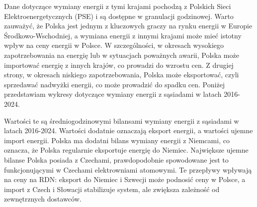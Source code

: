 Dane dotyczące wymiany energii z tymi krajami pochodzą z Polskich Sieci Elektroenergetycznych (PSE) i są dostępne w granulacji godzinowej. Warto zauważyć, że Polska jest jednym z kluczowych graczy na rynku energii w Europie Środkowo-Wschodniej, a wymiana energii z innymi krajami może mieć istotny wpływ na ceny energii w Polsce. W szczególności, w okresach wysokiego zapotrzebowania na energię lub w sytuacjach poważnych awarii, Polska może importować energię z innych krajów, co prowadzi do wzrostu cen. Z drugiej strony, w okresach niskiego zapotrzebowania, Polska może eksportować, czyli sprzedawać nadwyżki energii, co może prowadzić do spadku cen. Poniżej przedstawiam wykresy dotyczące wymiany energii z sąsiadami w latach 2016-2024.

\begin{table}[H]
    \centering
    \caption{Średni bilans wymiany energii z sąsiadami w latach 2016–2024}
    \label{tab:energy-trade-balance}
\end{table}

Wartości te są średniogodzinowymi bilansami wymiany energii z sąsiadami w latach 2016-2024. Wartości dodatnie oznaczają eksport energii, a wartości ujemne import energii. Polska ma dodatni bilans wymiany energii z Niemcami, co oznacza, że Polska regularnie eksportuje energię do Niemiec. Największe ujemne bilanse Polska posiada z Czechami, prawdopodobnie spowodowane jest to funkcjonującymi w Czechami elektrowniami atomowymi. Te przepływy wpływają na ceny na RDN: eksport do Niemiec i Szwecji może podnosić ceny w Polsce, a import z Czech i Słowacji stabilizuje system, ale zwiększa zależność od zewnętrznych dostawców.

